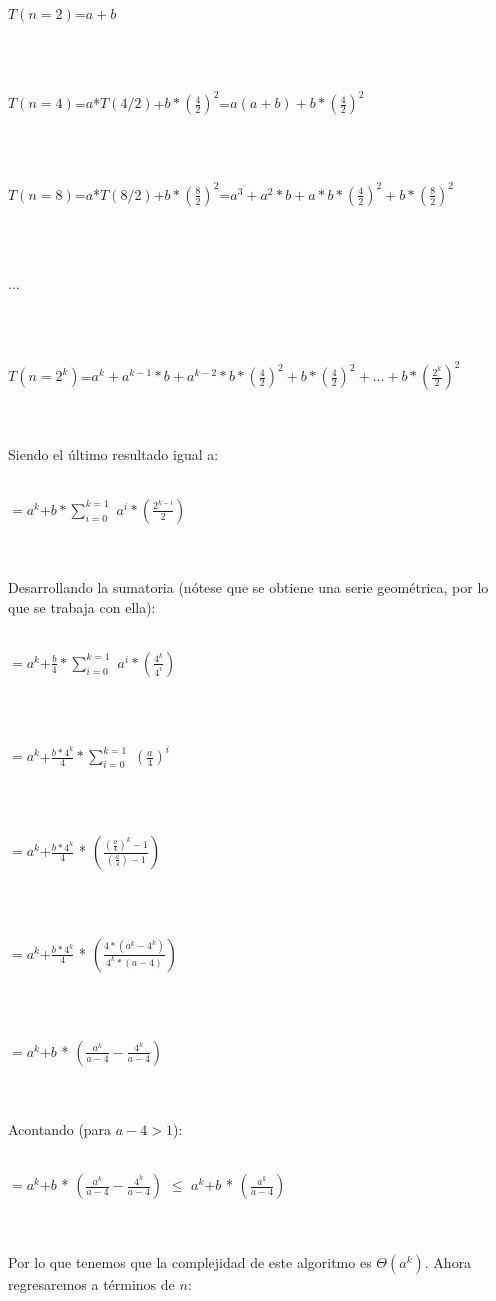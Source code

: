 \documentclass[12pt,twoside]{article}
\begin{document}
\centerline{$T(n=2)$=$a+b$}\\\\
\centerline{$T(n=4)$=$a$*$T(4/2)$+$b*(\frac{4}{2})^{2}$=$a(a+b)+b*(\frac{4}{2})^{2}$}\\\\
\centerline{$T(n=8)$=$a$*$T(8/2)$+$b*(\frac{8}{2})^{2}$=$a^{3}+a^{2}*b+a*b*(\frac{4}{2})^{2}+b*(\frac{8}{2})^{2}$}\\\\
\centerline{...}\\\\
\centerline{$T(n=2^{k})$=$a^{k}+a^{k-1}*b+a^{k-2}*b*(\frac{4}{2})^{2}+b*(\frac{4}{2})^{2}+...+b*(\frac{2^{k}}{2})^{2}$}\\\\
Siendo el \'ultimo resultado igual a:\\\\
\centerline{$=a^{k}$+$b*\sum_{i=0}^{k=1}$ $a^{i}*(\frac{2^{k-i}}{2})$}\\\\
Desarrollando la sumatoria (n\'otese que se obtiene una serie geom\'etrica, por lo que se trabaja con ella):\\\\
\centerline{$=a^{k}$+$\frac{b}{4} * \sum_{i=0}^{k=1}$ $a^{i}*(\frac{4^{k}}{4^{i}})$}\\\\
\centerline{$=a^{k}$+$\frac{b*4^{k}}{4} * \sum_{i=0}^{k=1}$ $(\frac{a}{4})^{i}$}\\\\
\centerline{$=a^{k}$+$\frac{b*4^{k}}{4}$ * $(\frac{(\frac{a}{4})^{k}-1}{(\frac{a}{4})-1})$}\\\\
\centerline{$=a^{k}$+$\frac{b*4^{k}}{4}$ * $(\frac{4*(a^{k}-4^{k})}{4^{k}*(a-4)})$}\\\\
\centerline{$=a^{k}$+$b$ * $(\frac{a^{k}}{a-4} - \frac{4^{k}}{a-4})$}\\\\
Acontando (para $a-4>1$):\\\\
\centerline{$=a^{k}$+$b$ * $(\frac{a^{k}}{a-4} - \frac{4^{k}}{a-4})$ $\leq$ $a^{k}$+$b$ * $(\frac{a^{k}}{a-4})$}\\\\
Por lo que tenemos que la complejidad de este algoritmo es $\Theta(a^{k})$.\newpage
Ahora regresaremos a t\'erminos de $n$:\\\\
\end{document}
